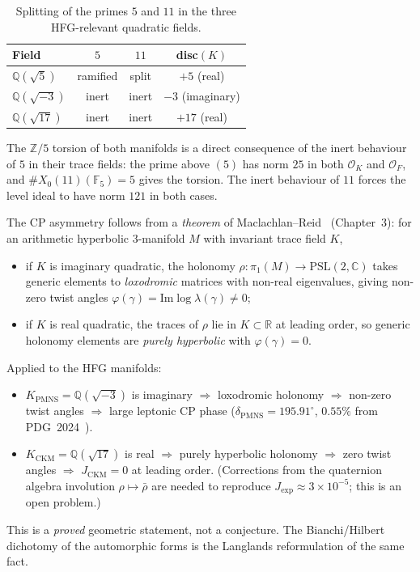 \documentclass[11pt,a4paper]{article}
\theoremstyle{definition}
\newcommand{\QQ}{\mathbb{Q}}
\newcommand{\ZZ}{\mathbb{Z}}
\newcommand{\KPMNS}{K_{\mathrm{PMNS}}}
\newcommand{\KCKM}{K_{\mathrm{CKM}}}
\begin{document}
\begin{table}[htbp]
\centering
\caption{Splitting of the primes $5$ and $11$ in the three
HFG-relevant quadratic fields.}
\label{tab:splitting}
\begin{tabular}{lccc}
\toprule
Field & $5$ & $11$ & disc$(K)$ \\
\midrule
$\QQ(\sqrt{5})$  & ramified & split    & $+5$ (real) \\
$\QQ(\sqrt{-3})$ & inert    & inert    & $-3$ (imaginary) \\
$\QQ(\sqrt{17})$ & inert    & inert    & $+17$ (real) \\
\bottomrule
\end{tabular}
\end{table}

The $\ZZ/5$ torsion of both manifolds is a direct consequence of
the inert behaviour of $5$ in their trace fields: the prime above
$(5)$ has norm $25$ in both $\mathcal{O}_K$ and $\mathcal{O}_F$,
and $\#X_0(11)(\mathbb{F}_5)=5$ gives the torsion.
The inert behaviour of $11$ forces the level ideal to have norm
$121$ in both cases.

The CP asymmetry follows from a \emph{theorem} of
Maclachlan--Reid~\cite{MaclachlanReid} (Chapter~3):
for an arithmetic hyperbolic 3-manifold $M$ with invariant trace
field $K$,
\begin{itemize}
\item if $K$ is imaginary quadratic, the holonomy
  $\rho:\pi_1(M)\to\mathrm{PSL}(2,\mathbb{C})$ takes generic
  elements to \emph{loxodromic} matrices with non-real
  eigenvalues, giving non-zero twist angles
  $\varphi(\gamma) = \mathrm{Im}\log\lambda(\gamma) \neq 0$;
\item if $K$ is real quadratic, the traces of $\rho$ lie in
  $K\subset\mathbb{R}$ at leading order, so generic holonomy
  elements are \emph{purely hyperbolic} with $\varphi(\gamma)=0$.
\end{itemize}
Applied to the HFG manifolds:
\begin{itemize}
\item $\KPMNS=\QQ(\sqrt{-3})$ is imaginary $\Rightarrow$
  loxodromic holonomy $\Rightarrow$ non-zero twist angles
  $\Rightarrow$ large leptonic CP phase
  ($\delta_{\mathrm{PMNS}} = 195.91^\circ$,
  $0.55\%$ from PDG~2024~\cite{Gentry:Unified}).
\item $\KCKM=\QQ(\sqrt{17})$ is real $\Rightarrow$
  purely hyperbolic holonomy $\Rightarrow$ zero twist angles
  $\Rightarrow$ $J_{\mathrm{CKM}}=0$ at leading order.
  (Corrections from the quaternion algebra involution
  $\rho\mapsto\bar\rho$ are needed to reproduce
  $J_{\mathrm{exp}}\approx3\times10^{-5}$; this is an
  open problem.)
\end{itemize}
This is a \emph{proved} geometric statement, not a conjecture.
The Bianchi/Hilbert dichotomy of the automorphic forms is the
Langlands reformulation of the same fact.
\end{document}
